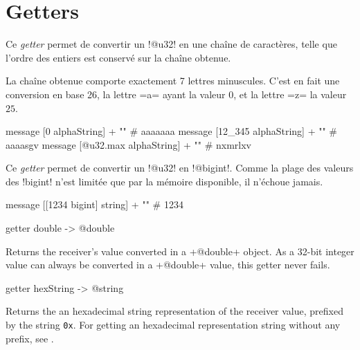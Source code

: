 \section{Getters}


Ce \emph{getter} permet de convertir un \ggsq!@u32! en une chaîne de caractères, telle que l'ordre des entiers est conservé sur la chaîne obtenue.

La chaîne obtenue comporte exactement 7 lettres minuscules. C'est en fait une conversion en base 26, la lettre \ggsq=a= ayant la valeur $0$, et la lettre \ggsq=z= la valeur $25$.


\begin{galgas4}
  message [0 alphaString] + "\n"         # aaaaaaa
  message [12_345 alphaString] + "\n"    # aaaasgv
  message [@u32.max alphaString] + "\n" # nxmrlxv
\end{galgas4}




Ce \emph{getter} permet de convertir un \ggsq!@u32! en \ggsq!@bigint!. Comme la plage des valeurs des \ggsq!bigint! n'est limitée que par la mémoire disponible, il n'échoue jamais.

\begin{galgas4}
  message [[1234 bigint] string] + "\n" # 1234
\end{galgas4}



\begin{galgas4}
getter double -> @double
\end{galgas4}

Returns the receiver's value converted in a \ggsq+@double+ object. As a 32-bit integer value can always be converted in a \ggsq+@double+ value, this getter never fails.




\begin{galgas4}
getter hexString -> @string
\end{galgas4}

Returns the an hexadecimal string representation of the receiver value, prefixed by the string \texttt{0x}. For getting an hexadecimal representation string without any prefix, see .




